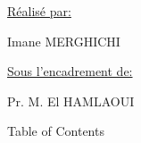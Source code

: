 \documentclass[12pt]{article}
\begin{document}
\vspace{\baselineskip}

\vspace{\baselineskip}

\vspace{\baselineskip}
\uline{Réalisé par:}\ \ \  \par

Imane MERGHICHI\par

\uline{Sous l’encadrement de:}\par

Pr. M. El HAMLAOUI\par


\vspace{\baselineskip}

\vspace{\baselineskip}

\vspace{\baselineskip}

\vspace{\baselineskip}

\vspace{\baselineskip}

\vspace{\baselineskip}

\vspace{\baselineskip}

\vspace{\baselineskip}
Table of Contents\par

\par

\par

\par

\par

\par

\par

\par

\par

\par

\par

\par

\par
\end{document}
